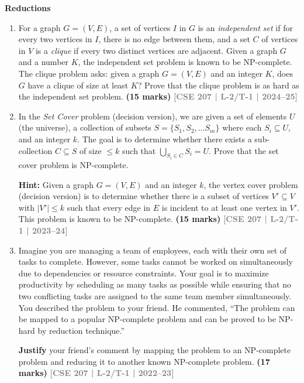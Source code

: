 \documentclass[12pt]{article}
\newcommand{\yr}[1]{\hfill\textcolor{gray}{\small\textbf{[#1]}}}
\newcommand{\mk}[1]{\textcolor{orange!70!black}{\small\textbf{(#1 marks)}}}
\newcounter{subtopicbm}
\newcommand{\subtopic}[2]{%
  \stepcounter{subtopicbm}%
  \pdfbookmark[2]{#2}{subtopicbm.\thesubtopicbm}%
  \vspace{10pt}
  \noindent\begin{tcolorbox}[colback=#1!8,colframe=#1,boxrule=0.6pt,arc=4pt,
    left=6pt,right=6pt,top=4pt,bottom=4pt]
    \small\bfseries\textcolor{#1}{#2}
  \end{tcolorbox}
  \vspace{2pt}
}
\begin{document}
\subtopic{cD}{Reductions}\label{sub:s4-reductions}

\begin{enumerate}

\item For a graph $G = (V, E)$, a set of vertices $I$ in $G$ is an \textit{independent set} if for every two vertices in $I$, there is no edge between them, and a set $C$ of vertices in $V$ is a \textit{clique} if every two distinct vertices are adjacent. Given a graph $G$ and a number $K$, the independent set problem is known to be NP-complete. The clique problem asks: given a graph $G = (V, E)$ and an integer $K$, does $G$ have a clique of size at least $K$? Prove that the clique problem is as hard as the independent set problem.
\mk{15} \yr{CSE 207 | L-2/T-1 | 2024--25}


\item In the \textit{Set Cover} problem (decision version), we are given a set of elements $U$ (the 
universe), a collection of subsets $S = \{S_1, S_2, \dots S_m\}$ where each $S_i \subseteq U$, and an integer 
$k$. The goal is to determine whether there exists a sub-collection $C \subseteq S$ of size $\le k$ such 
that $\bigcup_{S_i \in C} S_i = U$. Prove that the set cover problem is NP-complete.

\textbf{Hint:} Given a graph $G = (V, E)$ and an integer $k$, the vertex cover problem (decision 
version) is to determine whether there is a subset of vertices $V' \subseteq V$ with $|V'| \le k$ such 
that every edge in $E$ is incident to at least one vertex in $V'$. This problem is known to be 
NP-complete.
\mk{15} \yr{CSE 207 | L-2/T-1 | 2023--24}


\item Imagine you are managing a team of employees, each with their own set of tasks to 
    complete. However, some tasks cannot be worked on simultaneously due to 
    dependencies or resource constraints. Your goal is to maximize productivity by 
    scheduling as many tasks as possible while ensuring that no two conflicting tasks are 
    assigned to the same team member simultaneously. You described the problem to your 
    friend. He commented, ``The problem can be mapped to a popular NP-complete 
    problem and can be proved to be NP-hard by reduction technique.''
    
    \textbf{Justify} your friend's comment by mapping the problem to an NP-complete problem 
    and reducing it to another known NP-complete problem.
\mk{17} \yr{CSE 207 | L-2/T-1 | 2022--23}



\end{enumerate}
\end{document}
